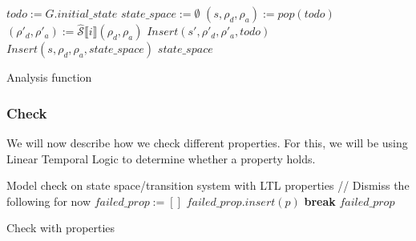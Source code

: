 \begin{algorithm}[htb!]
    \begin{codebox}
        \li $todo := G.initial\_state$
        \li $state\_space := \emptyset$
        \li {}
        \li \Do
        $(s,\rho_d,\rho_a):=pop(todo)$
        \li {}
        \li \Do $(\rho'_d,\rho'_a):=\widehat{\mathcal{S}}\llbracket i\rrbracket(\rho_d,\rho_a)$
        \li {}
        \li \Do $Insert(s',\rho'_d,\rho'_a,todo)$
        \End
        \End
        \li $Insert(s,\rho_d,\rho_a,state\_space)$
        \End
        \End
        \End
        \End
        \li \Return $state\_space$
    \end{codebox}
    \caption{Analysis function}
    \label{alg:analysis}

\end{algorithm}

\subsubsection{Check}\label{subsubsec:check}

We will now describe how we check different properties.
For this, we will be using Linear Temporal Logic to determine whether a property holds.

\begin{algorithm}[htb!]
    \begin{codebox}
        \li Model check on state space/transition system with LTL properties
        \li // Dismiss the following for now
        \li $failed\_prop := []$
        \li {}
        \li \Do {}
        \li \Do {}
        \li \Do $failed\_prop.insert(p)$
        \End
        \End
        \li \textbf{break}
        \End
        \End
        \End
        \End
        \li \Return $failed\_prop$
    \end{codebox}
    \caption{Check with properties}
    \label{alg:check}
\end{algorithm}
